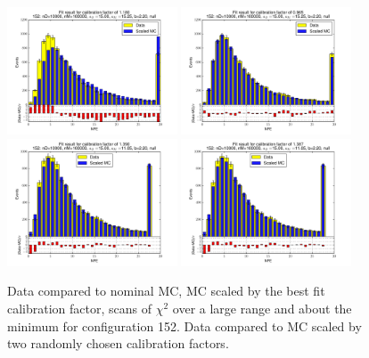 \begin{figure}[htbp]
\begin{center}
\includegraphics[width=0.45\textwidth]{../FIGURES/152/FIG_Fit_result_for_calibration_factor_of_1_180.pdf} 
\includegraphics[width=0.45\textwidth]{../FIGURES/152/FIG_Fit_result_for_calibration_factor_of_0_965.pdf} 
\includegraphics[width=0.45\textwidth]{../FIGURES/152/FIG_Fit_result_for_calibration_factor_of_1_390.pdf} 
\includegraphics[width=0.45\textwidth]{../FIGURES/152/FIG_Fit_result_for_calibration_factor_of_1_387.pdf} 
\caption{Data compared to nominal MC, MC scaled by the best fit calibration factor, scans of $\chi^2$ over a large range and about the minimum for configuration 152. Data compared to MC scaled by two randomly chosen calibration factors.} 
\label{tab:best_152} 
\end{center} \end{figure} 

